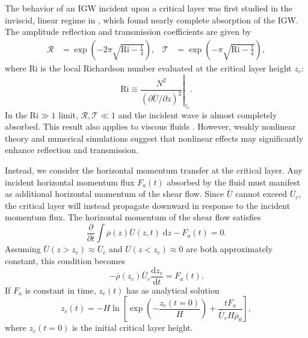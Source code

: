 \documentclass[
        fleqn,
        usenatbib,
        referee,
    ]{mnras}
\newcommand*{\rd}[2]{\frac{\mathrm{d}#1}{\mathrm{d}#2}}
\newcommand*{\pd}[2]{\frac{\partial#1}{\partial#2}}
\newcommand*{\pdil}[2]{\partial#1/\partial#2}
\newcommand*{\at}[1]{\left.#1\right|}
\newcommand*{\p}[1]{\left(#1\right)}
\newcommand*{\s}[1]{\left[#1\right]}
\begin{document}
The behavior of an IGW incident upon a critical layer was first studied in the
inviscid, linear regime in \citep{booker_bretherton}, which found nearly
complete absorption of the IGW\@. The amplitude
reflection and transmission coefficients are given by
\begin{align}
    \mathcal{R} &= \exp\p{-2\pi \sqrt{\mathrm{Ri} - \frac{1}{4}}}, &
    \mathcal{T} &= \exp\p{-\pi \sqrt{\mathrm{Ri} - \frac{1}{4}}},
        \label{eq:crit_coeffs}
\end{align}
where $\mathrm{Ri}$ is the local Richardson number evaluated at the critical
layer height $z_c$:
\begin{equation}
    \mathrm{Ri} \equiv \at{\frac{N^2}{\p{\pdil{\overline{U}}{z}}^2}}_{z_c}.
        \label{eq:ri_def}
\end{equation}
In the $\mathrm{Ri} \gg 1$ limit, $\mathcal{R}, \mathcal{T} \ll 1$ and the
incident wave is almost completely absorbed. This result also applies to viscous
fluids \citep{hazel}. However, weakly nonlinear theory \citep{brown_stewartson}
and numerical simulations \citep{winters1994} suggest that nonlinear effects may
significantly enhance reflection and transmission.

Instead, we consider the horizontal momentum transfer at the critical layer. Any
incident horizontal momentum flux $F_a(t)$ absorbed by the fluid must manifest
as additional horizontal momentum of the shear flow. Since $\overline{U}$ cannot
exceed $\overline{U}_c$, the critical layer will instead propagate downward in
response to the incident momentum flux. The horizontal momentum of the shear
flow satisfies
\begin{equation}
    \pd{}{t}\int\limits \overline{\rho}(z) \overline{U}(z, t)\;\mathrm{d}z
        - F_a(t) = 0.
\end{equation}
Assuming $\overline{U}(z > z_c) \approx \overline{U}_c$ and $\overline{U}(z <
z_c) \approx 0$ are both approximately constant, this condition becomes
\begin{equation}
    -\overline{\rho}(z_c) \overline{U}_c\rd{z_c}{t} = F_a(t).\label{eq:zc_anal}
\end{equation}
If $F_a$ is constant in time, $z_c(t)$ has as analytical solution
\begin{equation}
    z_c(t) = -H\ln \s{\exp\p{-\frac{z_c(t = 0)}{H}} +
        \frac{tF_a}{\overline{U}_c H\overline{\rho}_0}},\label{eq:zc_sol}
\end{equation}
where $z_c(t = 0)$ is the initial critical layer height.
\end{document}
